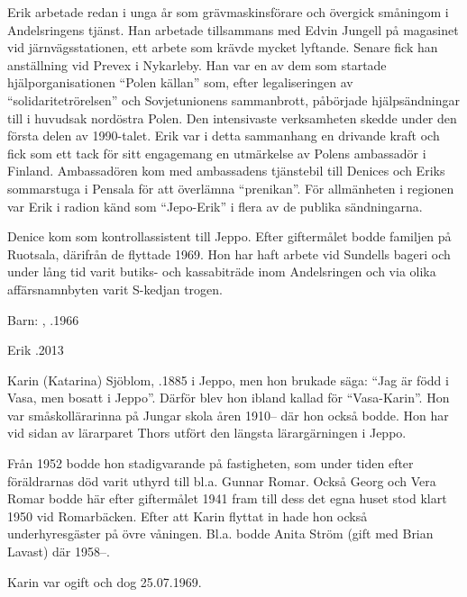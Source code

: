 Erik arbetade redan i unga år som grävmaskinsförare och övergick småningom i Andelsringens tjänst. Han arbetade tillsammans med Edvin Jungell på magasinet vid järnvägsstationen, ett arbete som krävde mycket lyftande.  Senare fick han anställning vid Prevex i Nykarleby. Han var en av dem som startade hjälporganisationen ``Polen källan'' som, efter legaliseringen av ``solidaritetrörelsen'' och Sovjetunionens sammanbrott, påbörjade hjälpsändningar till i huvudsak nordöstra Polen. Den intensivaste verksamheten skedde under den första delen av 1990-talet. Erik var i detta sammanhang en drivande kraft och fick som ett tack för sitt engagemang en utmärkelse av Polens ambassadör i Finland. Ambassadören kom med ambassadens tjänstebil till Denices och Eriks sommarstuga i Pensala för att överlämna ``prenikan''. För allmänheten i regionen var Erik i radion känd som ``Jepo-Erik'' i flera av de publika sändningarna.

Denice kom som kontrollassistent till Jeppo. Efter giftermålet bodde familjen på Ruotsala, därifrån de flyttade 1969. Hon har haft arbete vid Sundells bageri och under lång tid varit butiks- och kassabiträde inom Andelsringen och via olika affärsnamnbyten varit S-kedjan trogen.

Barn: , .1966

Erik .2013


%
Karin (Katarina) Sjöblom, .1885 i Jeppo, men hon brukade säga: ``Jag är född i Vasa, men bosatt i Jeppo''. Därför blev hon ibland kallad för ``Vasa-Karin''. Hon var småskollärarinna på Jungar skola åren 1910-- där hon också bodde. Hon har vid sidan av lärarparet Thors utfört den längsta lärargärningen i Jeppo.

Från 1952 bodde hon stadigvarande på fastigheten, som under tiden efter föräldrarnas död varit uthyrd till bl.a. Gunnar Romar. Också Georg och Vera Romar bodde här efter giftermålet 1941 fram till dess det egna huset stod klart 1950 vid Romarbäcken. Efter att Karin flyttat in hade hon också underhyresgäster på övre våningen. Bl.a. bodde Anita Ström (gift med Brian Lavast) där 1958--.

Karin var ogift och dog 25.07.1969.


